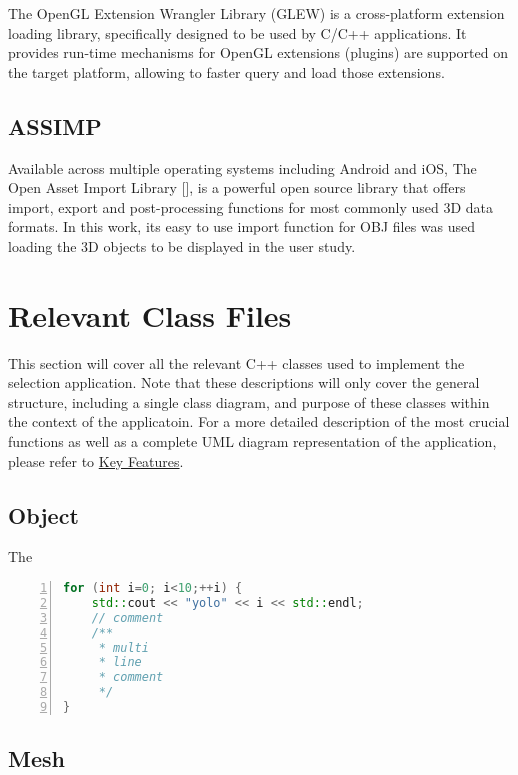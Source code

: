 The OpenGL Extension Wrangler Library (GLEW)\cite{GLEW} is a cross-platform extension loading library, specifically designed to be used by C/C++ applications. It provides run-time mechanisms for OpenGL extensions (plugins) are supported on the target platform, allowing to faster query and load those extensions.

\subsection{ASSIMP}
\label{sec:assimp}

Available across multiple operating systems including Android and iOS, The Open Asset Import Library [\cite{ASP}], is a powerful open source library that offers import, export and post-processing functions for most commonly used 3D data formats. In this work, its easy to use import function for OBJ files was used loading the 3D objects to be displayed in the user study.

\section{Relevant Class Files}
\label{sec:relevant_class_files}

This section will cover all the relevant C++ classes used to implement the selection application. Note that these descriptions will only cover the general structure, including a single class diagram, and purpose of these classes within the context of the applicatoin. For a more detailed description of the most crucial functions as well as a complete UML diagram representation of the application, please refer to \hyperref[sec:key_features]{Key Features}.

\subsection{Object}
\label{sec:object}

The 

\begin{lstlisting}[language=C++,numberstyle=\zebra{black!5}{white}{},numbers=left,xleftmargin=2em]
for (int i=0; i<10;++i) {
	std::cout << "yolo" << i << std::endl;
	// comment
	/**
	 * multi
	 * line
	 * comment
	 */
}
\end{lstlisting}

\subsection{Mesh}
\label{sec:mesh}

